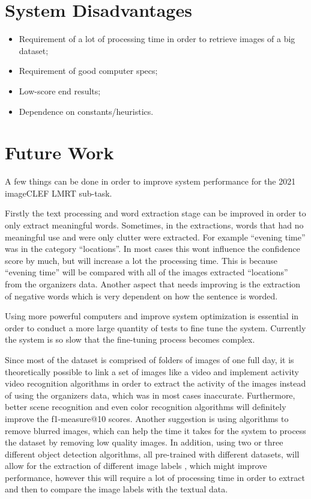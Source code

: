 \section{System Disadvantages}

\begin{itemize}
    \itemsep0em
    \item Requirement of a lot of processing time in order to retrieve images of a big dataset;
    \item Requirement of  good computer specs;
    \item Low-score end results;
    \item Dependence on constants/heuristics.
\end{itemize}

\section{Future Work}

A few things can be done in order to improve system performance for the 2021 imageCLEF LMRT sub-task.

Firstly the text processing and word extraction stage can be improved in order to only extract meaningful words. Sometimes, in the extractions, words that had no meaningful use and were only clutter were extracted. For example \enquote{evening time} was in the category \enquote{locations}. In most cases this wont influence the confidence score by much, but will increase a lot the processing time. This is because \enquote{evening time} will be compared with all of the images extracted \enquote{locations} from the organizers data. Another aspect that needs improving is the extraction of negative words which is very dependent on how the sentence is worded.

Using more powerful computers and improve system optimization is essential in order to conduct a more large quantity of tests to fine tune the system. Currently the system is so slow that the fine-tuning process becomes complex.

Since most of the dataset is comprised of folders of images of one full day, it is theoretically possible to link a set of images like a video and implement activity video recognition algorithms in order to extract the activity of the images instead of using the organizers data, which was in most cases inaccurate. Furthermore, better scene recognition and even color recognition algorithms will definitely improve the f1-measure@10 scores. Another suggestion is using algorithms to remove blurred images, which can help the time it takes for the system to process the dataset by removing low quality images. In addition, using two or three different object detection algorithms, all pre-trained with different datasets, will allow for the extraction of different image labels , which might improve performance, however this will require a lot of processing time in order to extract and then to compare the image labels with the textual data.

